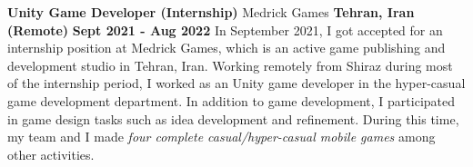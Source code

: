 

\begin{cventries}

  \cventry
    {\textbf{Unity Game Developer (Internship)}} %
    {Medrick Games} %
    {\textbf{Tehran, Iran (Remote)}} %
    {\textbf{Sept 2021 - Aug 2022}} %
    {
      In September 2021, I got accepted for an internship position at Medrick Games, which is an active game publishing and development studio in Tehran, Iran. Working remotely from Shiraz during most of the internship period, I worked as an Unity game developer in the hyper-casual game development department. In addition to game development, I participated in game design tasks such as idea development and refinement. During this time, my team and I made \emph{four complete casual/hyper-casual mobile games} among other activities.
    }

\end{cventries}
